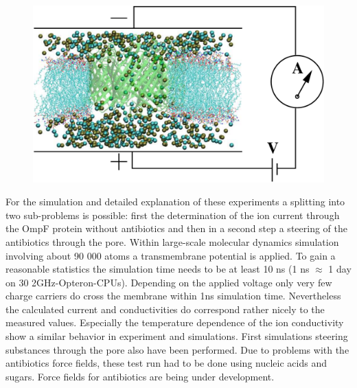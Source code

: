 \begin{figure}[ht]
  \begin{center}
   \includegraphics[width=\hsize]{Kleinekathoefer/kleinekathoefer_fig1.pdf}
     \label{fig:profkleinekathoefer1}
   \end{center}
\end{figure}

For the simulation and detailed explanation of these experiments a
splitting into two sub-problems is possible: first the determination of the
ion current through the OmpF protein without antibiotics and then in a
second step a steering of the antibiotics through the pore. Within
large-scale molecular dynamics simulation involving about 90 000 atoms a
transmembrane potential is applied. To gain a reasonable statistics the
simulation time needs to be at least 10 ns (1 ns $\approx$ 1 day on 30
2GHz-Opteron-CPUs). Depending on the applied voltage only very few charge
carriers do cross the membrane within 1ns simulation time. Nevertheless the
calculated current and conductivities do correspond rather nicely to the
measured values. Especially the temperature dependence of the ion
conductivity show a similar behavior in experiment and simulations.
First simulations steering substances through the pore also have been
performed. Due to problems with the antibiotics force fields, these test
run had to be done using nucleic acids and sugars. Force fields for
antibiotics are being under development.



